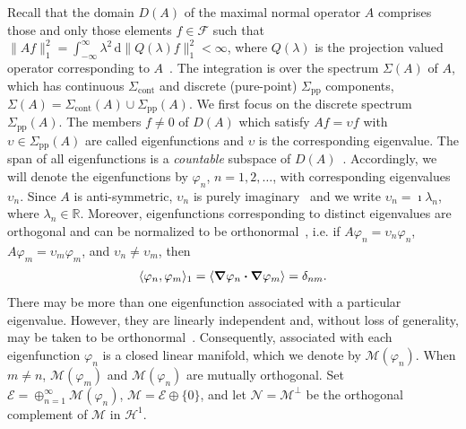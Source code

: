 \documentclass[leqno,onefignum,onetabnum]{siamltex1213}
\renewcommand{\d}{\mathrm{d}}
\newcommand{\Sigc}{\Sigma_{\text{cont}}}
\newcommand{\Sigp}{\Sigma_{\text{pp}}}
\newcommand{\Ec}{\mathcal{E}}
\newcommand{\Mc}{\mathcal{M}}
\newcommand{\Nc}{\mathcal{N}}
\newcommand{\Hs}{\mathscr{H}}
\newcommand{\Fs}{\mathscr{F}}
\newcommand\bnabla{\mbox{\boldmath${\nabla}$}}
\providecommand\bcdot{\boldsymbol{\cdot}}
\begin{document}
Recall that the domain $D(A)$ of the maximal normal operator $A$
comprises those and only those elements $f\in\Fs$ such that
$\|Af\|_1^2=\int_{-\infty}^\infty\lambda^2\,\d\|Q(\lambda)f\|_1^2<\infty$, where $Q(\lambda)$ is the
projection valued operator corresponding to $A$~\cite{Stone:64}. The
integration is over the spectrum $\Sigma(A)$ of $A$, which has continuous
$\Sigc$ and discrete (pure-point) $\Sigp$ components,
$\Sigma(A)=\Sigc(A)\cup\Sigp(A)$. We first focus on the discrete spectrum
$\Sigp(A)$. The members $f\neq0$ of $D(A)$ which satisfy $Af=\upsilon f$ with
$\upsilon\in\Sigp(A)$ are called eigenfunctions and $\upsilon$ is the corresponding
eigenvalue. The span of all eigenfunctions is a \emph{countable}
subspace of $D(A)$~\cite{Reed-1980,Stone:64}. Accordingly, we will
denote the eigenfunctions by $\varphi_n$, $n=1,2,\ldots$, with corresponding
eigenvalues $\upsilon_n$. Since $A$ is anti-symmetric, $\upsilon_n$ is purely
imaginary~\cite{Stone:64,Horn_Johnson-1990} and we write $\upsilon_n=\imath\lambda_n$,
where $\lambda_n\in\mathbb{R}$.  Moreover, eigenfunctions corresponding to
distinct eigenvalues are orthogonal and can be normalized to be
orthonormal~\cite{Stone:64}, i.e. if $A\varphi_n=\upsilon_n\varphi_n$, $A\varphi_m=\upsilon_m\varphi_m$, and
$\upsilon_n\neq\upsilon_m$, then
%
\begin{align}\label{eq:Orthogonal}
  \langle\varphi_n,\varphi_m\rangle_1=\langle\bnabla \varphi_n\bcdot\bnabla \varphi_m\rangle=\delta_{nm}.
\end{align}
%
There may be more than one
eigenfunction associated with a particular eigenvalue. However, they
are linearly independent and, without loss of generality, may be taken
to be orthonormal~\cite{Stone:64}. Consequently, associated with each
eigenfunction $\varphi_n$ is a closed linear manifold, which we denote
by $\Mc(\varphi_n)$. When $m\neq n$, $\Mc(\varphi_m)$ and $\Mc(\varphi_n)$ are mutually
orthogonal. Set $\Ec=\oplus_{n=1}^\infty\Mc(\varphi_n)$, $\Mc=\Ec\oplus\{0\}$, and let
$\Nc=\Mc^\perp$ be the orthogonal complement of $\Mc$ in $\Hs^1$.  
\end{document}

